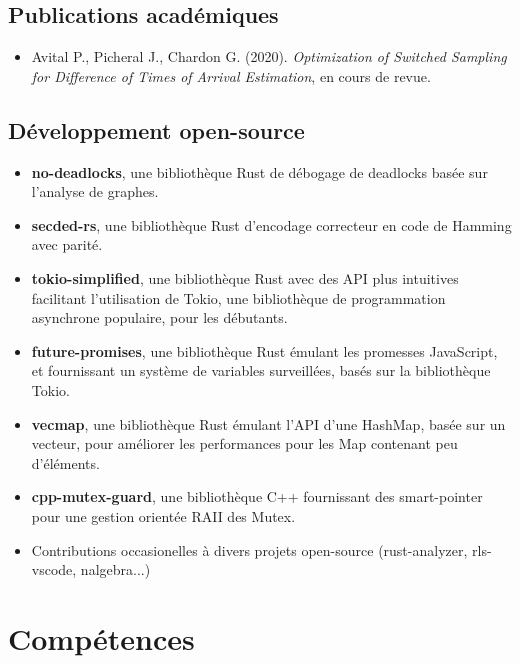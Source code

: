 \documentclass[11pt,a4paper,sans]{moderncv}        %
\begin{document}
\subsection{Publications académiques}
\begin{itemize}
    \item Avital P., Picheral J., Chardon G. (2020). \emph{Optimization of Switched Sampling for Difference of Times of Arrival Estimation}, en cours de revue.
\end{itemize}
\subsection{Développement open-source}
\begin{itemize}
    \item \textbf{no-deadlocks}, une bibliothèque Rust de débogage de deadlocks basée sur l'analyse de graphes.
    \item \textbf{secded-rs}, une bibliothèque Rust d'encodage correcteur en code de Hamming avec parité.
    \item \textbf{tokio-simplified}, une bibliothèque Rust avec des API plus intuitives facilitant l'utilisation de Tokio, une bibliothèque de programmation asynchrone populaire, pour les débutants.
    \item \textbf{future-promises}, une bibliothèque Rust émulant les promesses JavaScript, et fournissant un système de variables surveillées, basés sur la bibliothèque Tokio.
    \item \textbf{vecmap}, une bibliothèque Rust émulant l'API d'une HashMap, basée sur un vecteur, pour améliorer les performances pour les Map contenant peu d'éléments.
    \item \textbf{cpp-mutex-guard}, une bibliothèque C++ fournissant des smart-pointer pour une gestion orientée RAII des Mutex.
    \item Contributions occasionelles à divers projets open-source (rust-analyzer, rls-vscode, nalgebra...)
\end{itemize}

\section{Compétences}

\vspace{6pt}
\end{document}
